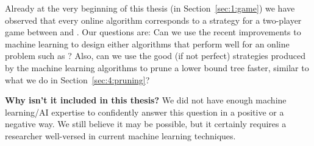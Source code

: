 \begin{enumerate}
Already at the very beginning of this thesis (in
Section~\ref{sec:1:game}) we have observed that every online algorithm
corresponds to a strategy for a two-player game between \algo and
\adversary. Our questions are: Can we use the recent improvements to
machine learning to design either algorithms that perform well for an
online problem such as \binstretch? Also, can we use the good (if not
perfect) strategies produced by the machine learning algorithms to
prune a lower bound tree faster, similar to what we do in
Section~\ref{sec:4:pruning}?

\noindent\textbf{Why isn't it included in this thesis?} We did not
have enough machine learning/AI expertise to confidently answer this
question in a positive or a negative way. We still believe it may be
possible, but it certainly requires a researcher well-versed in
current machine learning techniques.

\end{enumerate}